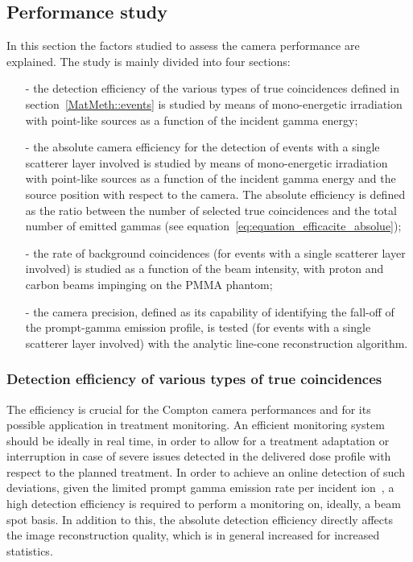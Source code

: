 \subsection{Performance study}
\label{MatMeth:performance}
In this section the factors studied to assess the camera performance are explained. The study is mainly divided into four sections:
\begin{itemize}
\item[-] the detection efficiency of the various types of true coincidences defined in section~\ref{MatMeth::events} is studied by means of mono-energetic irradiation with point-like sources as a function of the incident gamma energy;
\item[-] the absolute camera efficiency for the detection of events with a single scatterer layer involved is studied by means of mono-energetic irradiation with point-like sources as a function of the incident gamma energy and the source position with respect to the camera. The absolute efficiency is defined as the ratio between the number of selected true coincidences and the total number of emitted gammas (see equation~\ref{eq:equation_efficacite_absolue}); 
\item[-] the rate of background coincidences (for events with a single scatterer layer involved) is studied as a function of the beam intensity, with proton and carbon beams impinging on the PMMA phantom;
\item[-] the camera precision, defined as its capability of identifying the fall-off of the prompt-gamma emission profile, is tested (for events with a single scatterer layer involved) with the analytic line-cone reconstruction algorithm. 
\end{itemize}

\subsubsection{Detection efficiency of various types of true coincidences}\label{relEff}
The efficiency is crucial for the Compton camera performances and for its possible application in treatment monitoring. An efficient monitoring system should be ideally in real time, in order to allow for a treatment adaptation or interruption in case of severe issues detected in the delivered dose profile with respect to the planned treatment. In order to achieve an online detection of such deviations, given the limited prompt gamma emission rate per incident ion~\cite{Ortega:2015aa}, a high detection efficiency is required to perform a monitoring on, ideally, a beam spot basis. In addition to this, the absolute detection efficiency directly affects the image reconstruction quality, which is in general increased for increased statistics.

